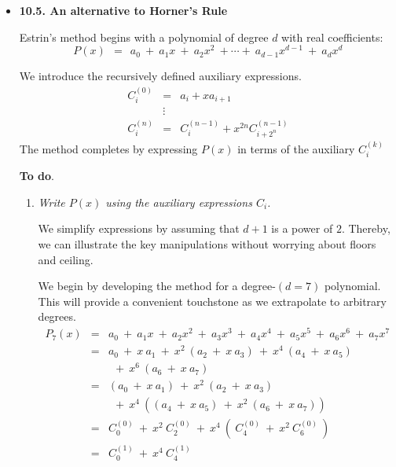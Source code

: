 
\begin{itemize}
\item {\bf 10.5. An alternative to Horner's Rule}

\smallskip

Estrin's method begins with a polynomial of degree $d$ with real coefficients:
\[
P(x) \ \ = \ \ a_0 \ + \ a_1 x \ + \ a_2 x^2 \ + \cdots + \ a_{d-1} x^{d-1} \ + \ a_d x^d
\]

We introduce the recursively defined auxiliary expressions.  
\begin{eqnarray*}
C_i^{(0)} & = & a_i + x a_{i+1} \\
                &\vdots &  \\
C_i^{(n)}  & = & C_i^{(n-1)} + x^{2n} C_{i+2^n}^{(n-1)}
\end{eqnarray*}
The method completes by expressing $P(x)$ in terms of the auxiliary $C_i^{(k)}$

\medskip

{\bf To do}.
\begin{enumerate}
\item
{\em Write $P(x)$ using the auxiliary expressions $C_i$.}  

\smallskip

We simplify expressions by assuming that $d+1$ is a power of $2$.  Thereby, we can illustrate the key manipulations without worrying about floors and ceiling.

\smallskip

We begin by developing the method for a degree-$(d=7)$ polynomial.  This will provide a convenient touchstone as we extrapolate to arbitrary degrees.
\begin{eqnarray*}
P_7(x) & = & a_0 \ + \ a_1 x \ + \ a_2 x^2 \ + \ a_{3} x^{3} \ + \ a_4 x^4 \ + \ a_{5} x^{5} \ + \ a_{6} x^{6} \ + \ a_7 x^7 \\
           & = & a_0 \ + \ x \ a_1 \ + \ x^2 \ (a_2 \ + \ x \ a_3) \ + \ x^4 \ (a_4 \ + \ x \ a_5) \\
           &  &  \ \ + \ x^6 \ (a_6 \ + \ x \ a_7) \\
          & = & (a_0 \ + \ x \ a_1) \ + \ x^2 \ (a_2 \ + \ x \ a_3) \\
           & & \ \ + \ x^4 \ \left( (a_4 \ + \ x \ a_5) \ + \ x^2 \ (a_6 \ + \ x \ a_7) \right) \\
          & = & C_{0}^{(0)} \ + \ x^2 \ C_2^{(0)} \ + \ x^4 \ ( \ C_4^{(0)} \ + \ x^2 \ C_{6}^{(0)} \ ) \\
          & = & C_0^{(1)} \ + \ x^4 \ C_4^{(1)} 
\end{eqnarray*}


\end{enumerate}
\end{itemize}
